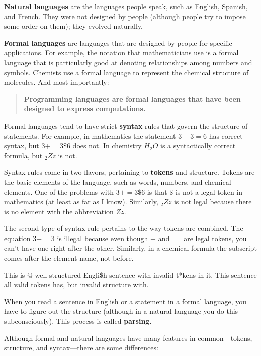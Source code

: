 \documentclass[10pt]{book}
\begin{document}
{\bf Natural languages} are the languages people speak,
such as English, Spanish, and French.  They were not designed
by people (although people try to impose some order on them);
they evolved naturally.

{\bf Formal languages} are languages that are designed by people for
specific applications.  For example, the notation that mathematicians
use is a formal language that is particularly good at denoting
relationships among numbers and symbols.  Chemists use a formal
language to represent the chemical structure of molecules.  And
most importantly:

\begin{quote}
{\bf Programming languages are formal languages that have been
designed to express computations.}
\end{quote}

Formal languages tend to have strict {\bf syntax} rules that
govern the structure of statements.
For example, in mathematics the statement
$3 + 3 = 6$ has correct syntax, but
$3 + = 3 \$ 6$ does not.  In chemistry
$H_2O$ is a syntactically correct formula, but $_2Zz$ is not.

Syntax rules come in two flavors, pertaining to {\bf tokens} and
structure.  Tokens are the basic elements of the language, such as
words, numbers, and chemical elements.  One of the problems with
$3 += 3 \$ 6$ is that \( \$ \) is not a legal token in mathematics
(at least as far as I know).  Similarly, $_2Zz$ is not legal because
there is no element with the abbreviation $Zz$.

The second type of syntax rule pertains to the way tokens are
combined.  The equation $3 += 3$ is illegal because even though $+$
and $=$ are legal tokens, you can't have one right after the other.
Similarly, in a chemical formula the subscript comes after the element
name, not before.

This is @ well-structured Engli\$h
sentence with invalid t*kens in it.  This sentence all valid tokens
has, but invalid structure with.

When you read a sentence in English or a statement in a formal
language, you have to figure out the structure
(although in a natural language you do this subconsciously).  This
process is called {\bf parsing}.

Although formal and natural languages have many features in
common---tokens, structure, and syntax---there are some
differences:
\end{document}
